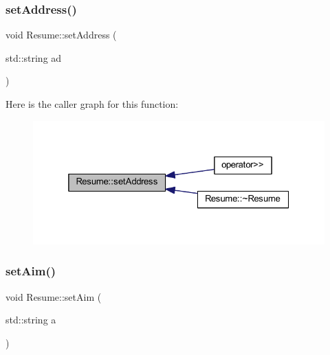 \hypertarget{class_resume_a03adc6528b2ed6302008a249109005a8}{}\label{class_resume_a03adc6528b2ed6302008a249109005a8} 
\subsubsection{\texorpdfstring{set\+Address()}{setAddress()}}
{\footnotesize\ttfamily void Resume\+::set\+Address (\begin{DoxyParamCaption}\item[{std\+::string}]{ad }\end{DoxyParamCaption})}

Here is the caller graph for this function\+:
\nopagebreak
\begin{figure}[H]
\begin{center}
\leavevmode
\includegraphics[width=325pt]{class_resume_a03adc6528b2ed6302008a249109005a8_icgraph}
\end{center}
\end{figure}
\hypertarget{class_resume_a48d6e397c93b741a2fe96ba83f36c40f}{}\label{class_resume_a48d6e397c93b741a2fe96ba83f36c40f} 
\subsubsection{\texorpdfstring{set\+Aim()}{setAim()}}
{\footnotesize\ttfamily void Resume\+::set\+Aim (\begin{DoxyParamCaption}\item[{std\+::string}]{a }\end{DoxyParamCaption})}

